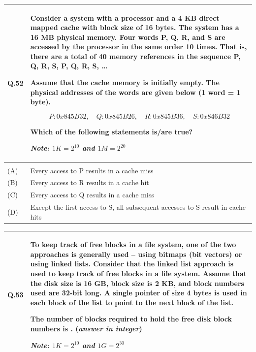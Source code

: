 \documentclass[14pt]{article}
\begin{document}
\begin{tabular}{|p{1.5cm}|p{12cm}|}
\hline
Q.52 &
\parbox[t]{\linewidth}{
Consider a system with a processor and a 4 KB direct mapped cache with block size of 16 bytes. The system has a 16 MB physical memory. Four words P, Q, R, and S are accessed by the processor in the same order 10 times. That is, there are a total of 40 memory references in the sequence P, Q, R, S, P, Q, R, S, \ldots

\vspace{0.2cm}

Assume that the cache memory is initially empty. The physical addresses of the words are given below (1 word = 1 byte).

\[
P: 0x845B32,\quad
Q: 0x845B26,\quad
R: 0x845B36,\quad
S: 0x846B32
\]

Which of the following statements is/are true?

\vspace{0.2cm}

\textit{Note: $1K=2^{10}$ and $1M=2^{20}$}

\vspace{0.3cm}
}
\\
\hline
& \\
\hline
(A) & Every access to P results in a cache miss \\
\hline
(B) & Every access to R results in a cache hit \\
\hline
(C) & Every access to Q results in a cache miss \\
\hline
(D) & Except the first access to S, all subsequent accesses to S result in cache hits \\
\hline
\end{tabular}

\vspace{0.3cm}

\begin{tabular}{|p{1.5cm}|p{12cm}|}
\hline
Q.53 &
To keep track of free blocks in a file system, one of the two approaches is generally used -- using bitmaps (bit vectors) or using linked lists. Consider that the linked list approach is used to keep track of free blocks in a file system. Assume that the disk size is 16 GB, block size is 2 KB, and block numbers used are 32-bit long. A single pointer of size 4 bytes is used in each block of the list to point to the next block of the list.

\vspace{0.2cm}

The number of blocks required to hold the free disk block numbers is \underline{\hspace{2cm}}. (\textit{answer in integer})

\vspace{0.2cm}

\textit{Note: $1K=2^{10}$ and $1G=2^{30}$}

\rule{0pt}{0.8cm}
\\
\hline
\end{tabular}
\end{document}
